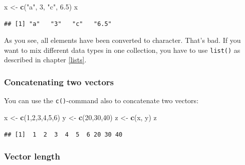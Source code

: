 \documentclass[
]{scrartcl}
\newenvironment{Shaded}{\begin{snugshade}}{\end{snugshade}}
\newcommand{\DecValTok}[1]{\textcolor[rgb]{0.00,0.00,0.81}{#1}}
\newcommand{\FloatTok}[1]{\textcolor[rgb]{0.00,0.00,0.81}{#1}}
\newcommand{\FunctionTok}[1]{\textcolor[rgb]{0.13,0.29,0.53}{\textbf{#1}}}
\newcommand{\NormalTok}[1]{#1}
\newcommand{\OtherTok}[1]{\textcolor[rgb]{0.56,0.35,0.01}{#1}}
\newcommand{\StringTok}[1]{\textcolor[rgb]{0.31,0.60,0.02}{#1}}
\begin{document}
\begin{Shaded}
\begin{Highlighting}[]
\NormalTok{x }\OtherTok{\textless{}{-}} \FunctionTok{c}\NormalTok{(}\StringTok{"a"}\NormalTok{, }\DecValTok{3}\NormalTok{, }\StringTok{"c"}\NormalTok{, }\FloatTok{6.5}\NormalTok{)}
\NormalTok{x}
\end{Highlighting}
\end{Shaded}

\begin{verbatim}
## [1] "a"   "3"   "c"   "6.5"
\end{verbatim}

As you see, all elements have been converted to character. That's bad. If you want to mix different data types in one collection, you have to use \texttt{list()} as described in chapter \ref{lists}.

\hypertarget{concatenating-two-vectors}{%
\subsubsection*{Concatenating two vectors}\label{concatenating-two-vectors}}

You can use the \texttt{c()}-command also to concatenate two vectors:

\begin{Shaded}
\begin{Highlighting}[]
\NormalTok{x }\OtherTok{\textless{}{-}} \FunctionTok{c}\NormalTok{(}\DecValTok{1}\NormalTok{,}\DecValTok{2}\NormalTok{,}\DecValTok{3}\NormalTok{,}\DecValTok{4}\NormalTok{,}\DecValTok{5}\NormalTok{,}\DecValTok{6}\NormalTok{)}
\NormalTok{y }\OtherTok{\textless{}{-}} \FunctionTok{c}\NormalTok{(}\DecValTok{20}\NormalTok{,}\DecValTok{30}\NormalTok{,}\DecValTok{40}\NormalTok{)}
\NormalTok{z }\OtherTok{\textless{}{-}} \FunctionTok{c}\NormalTok{(x, y)}
\NormalTok{z}
\end{Highlighting}
\end{Shaded}

\begin{verbatim}
## [1]  1  2  3  4  5  6 20 30 40
\end{verbatim}

\hypertarget{vector-length}{%
\subsubsection*{Vector length}\label{vector-length}}
\end{document}
